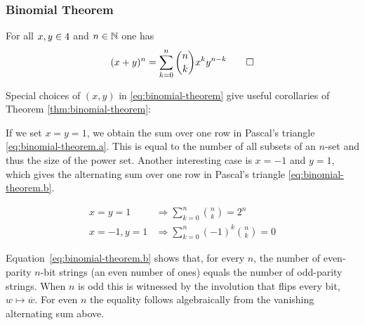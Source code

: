 \subsubsection{Binomial Theorem}
\label{subsubsec:binomial-theorem}
\begin{theorem}\label{thm:binomial-theorem}
For all \(x,y \in 4\) and \(n \in \mathbb{N}\) one has
\begin{equation}\label{eq:binomial-theorem}
  (x+y)^n
  =
  \sum_{k=0}^{n}\binom{n}{k}x^{k}y^{n-k} \qedhere
\end{equation}
\end{theorem}

Special choices of \((x,y)\) in \eqref{eq:binomial-theorem} give useful corollaries of Theorem \ref{thm:binomial-theorem}:

If we set $x=y=1$, we obtain the sum over one row in Pascal's triangle \eqref{eq:binomial-theorem.a}.
This is equal to the number of all subsets of an $n$-set and thus the size of the power set.
Another interesting case is \(x=-1\) and \(y=1\), which gives the alternating sum over one row in Pascal's triangle \eqref{eq:binomial-theorem.b}.
\addtocounter{equation}{-1}
\vspace{-1\baselineskip}
\begin{subequations}
  \begin{align}
  x=y=1  &\Longrightarrow \sum_{k=0}^{n}\binom{n}{k} \label{eq:binomial-theorem.a} = 2^{n} \\
  x=-1,y=1  &\Longrightarrow \sum_{k=0}^{n}(-1)^{k}\binom{n}{k}=0 \label{eq:binomial-theorem.b} 
  \end{align}
\end{subequations}

\begin{remark}\label{rem:even-odd-strings} 
Equation~\eqref{eq:binomial-theorem.b} shows that, for every \(n\), the number of even-parity \(n\)-bit strings (an even number of ones) equals the number of odd-parity strings.  
When \(n\) is odd this is witnessed by the involution that flips every bit, \(w\mapsto\overline{w}\).  
For even \(n\) the equality follows algebraically from the vanishing alternating sum above.
\end{remark}

